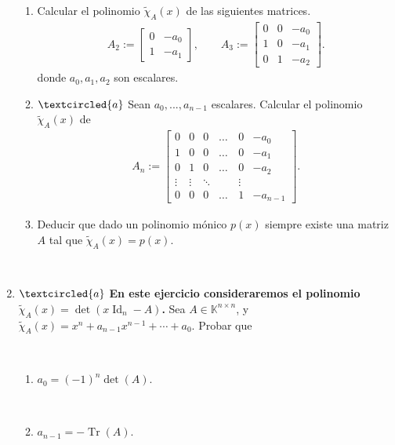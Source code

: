 \documentclass[12pt]{amsart}
\begin{document}
\begin{enumerate}[resume]
\begin{enumerate}
\item  Calcular el polinomio $\tilde\chi_A(x)$ de las siguientes matrices.
\begin{align*}
A_2 := \begin{bmatrix} 0 & -a_0 \\ 1 & -a_1
\end{bmatrix},\quad\quad
A_3 := \begin{bmatrix} 0 & 0 & -a_0 \\ 1 & 0 & -a_1 \\ 0 & 1 & -a_2
\end{bmatrix}.
\end{align*}
donde $a_0, a_1, a_2$ son escalares.

\item\label{matriz de un polinomio} $\textcircled{a}$ Sean $a_0, ..., a_{n-1}$ escalares. Calcular el polinomio $\tilde\chi_A(x)$ de
\begin{align*}
A_n := \begin{bmatrix} 0 & 0 & 0 &\dots & 0 & -a_0 \\ 1 & 0 & 0&  \dots & 0  & -a_1 \\ 0 & 1 & 0&  \dots & 0  & -a_2 \\ \vdots & \vdots & \ddots & \quad  & \vdots\\ 0 & 0 & 0 & \dots & 1  & -a_{n-1}
\end{bmatrix}.		
 \end{align*}

 \item Deducir que dado un polinomio m\'onico $p(x)$ siempre existe una matriz $A$ tal que $\tilde\chi_A(x)=p(x)$.


\end{enumerate}

\

\item\label{tr det}$\textcircled{a}$ {\bf En este ejercicio consideraremos el polinomio $\tilde\chi_A(x)=\det(x\operatorname{Id}_n-A)$.}
Sea $A\in\mathbb{K}^{n\times n}$, y \ $\tilde\chi_A(x) = x^n+a_{n-1}x^{n-1}+\cdots+a_0$. Probar que

\ 

\begin{enumerate}
	\item $a_0 = (-1)^n \det(A)$.

\

	\item $a_{n-1} = - \operatorname{Tr}(A)$.
\end{enumerate}



\end{enumerate}
\end{document}
